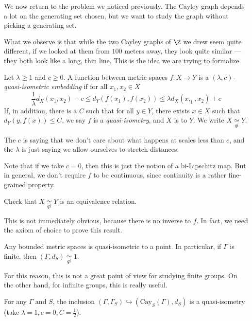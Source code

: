 \documentclass[a4paper]{article}
\newcommand\Cay{\mathrm{Cay}}
\newcommand{\qi}{\underset{qi}{\simeq}}
\begin{document}
We now return to the problem we noticed previously. The Cayley graph depends a lot on the generating set chosen, but we want to study the graph without picking a generating set.

What we observe is that while the two Cayley graphs of $\Z$ we drew seem quite different, if we looked at them from $100$ meters away, they look quite similar --- they both look like a long, thin line. This is the idea we are trying to formalize.

\begin{defi}
  Let $\lambda \geq 1$ and $c \geq 0$. A function between metric spaces $f: X \to Y$ is a \emph{$(\lambda, c)$-quasi-isometric embedding} if for all $x_1, x_2 \in X$
  \[
    \frac{1}{\lambda} d_X(x_1, x_2) - c \leq d_Y(f(x_1), f(x_2)) \leq \lambda d_X(x,_1, x_2) + c
  \]
  If, in addition, there is a $C$ such that for all $y \in Y$, there exists $x \in X$ such that $d_Y(y, f(x)) \leq C$, we say $f$ is a \emph{quasi-isometry}, and $X$ is  to $Y$. We write $X\qi Y$.
\end{defi}
The $c$ is saying that we don't care about what happens at scales less than $c$, and the $\lambda$ is just saying we allow ourselves to stretch distances.

Note that if we take $c = 0$, then this is just the notion of a bi-Lipschitz map. But in general, we don't require $f$ to be continuous, since continuity is a rather fine-grained property.

\begin{ex}
  Check that $ X\qi Y$ is an equivalence relation.
\end{ex}
This is not immediately obvious, because there is no inverse to $f$. In fact, we need the axiom of choice to prove this result.

\begin{eg}
  Any bounded metric spaces is quasi-isometric to a point. In particular, if $\Gamma$ is finite, then $(\Gamma, d_S) \qi 1$.
\end{eg}
For this reason, this is not a great point of view for studying finite groups. On the other hand, for infinite groups, this is really useful.

\begin{eg}
  For any $\Gamma$ and $S$, the inclusion $(\Gamma, \Gamma_S)\hookrightarrow (\Cay_S(\Gamma), d_S)$ is a quasi-isometry (take $\lambda = 1, c = 0, C = \frac{1}{2}$).
\end{eg}
\end{document}
